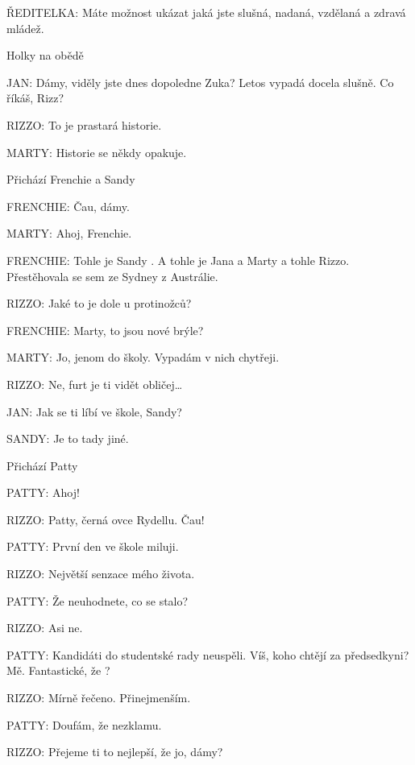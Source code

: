 \rep ŘEDITELKA:        Máte možnost ukázat jaká jste slušná, nadaná, vzdělaná a zdravá mládež.       

\scene Holky na obědě 

\rep JAN:        Dámy, viděly jste dnes dopoledne Zuka? Letos vypadá docela slušně.         Co říkáš, Rizz?

\rep RIZZO:        To je prastará historie.

\rep MARTY:        Historie se někdy opakuje.

\pop Přichází Frenchie a Sandy

\rep FRENCHIE:        Čau, dámy.

\rep MARTY:        Ahoj, Frenchie.

\rep FRENCHIE:        Tohle je Sandy . A tohle je Jana a Marty a tohle Rizzo. Přestěhovala se         sem ze Sydney z Austrálie.

\rep RIZZO:        Jaké to je dole u protinožců?

\rep FRENCHIE:        Marty, to jsou nové brýle?

\rep MARTY:        Jo, jenom do školy. Vypadám v nich chytřeji.

\rep RIZZO:        Ne, furt je ti vidět obličej…

\rep JAN:        Jak se ti líbí ve škole, Sandy?

\rep SANDY:        Je to tady jiné. 

\pop Přichází Patty

\rep PATTY:        Ahoj!

\rep RIZZO:         Patty, černá ovce Rydellu.  Čau! 

\rep PATTY:        První den ve škole miluji.

\rep RIZZO:        Největší senzace mého života.

\rep PATTY:        Že neuhodnete, co se stalo?

\rep RIZZO:        Asi ne.

\rep PATTY:        Kandidáti do studentské rady neuspěli. Víš, koho chtějí za                         předsedkyni? Mě. Fantastické, že ?

\rep RIZZO:        Mírně řečeno. Přinejmenším.

\rep PATTY:        Doufám, že nezklamu.

\rep RIZZO:        Přejeme ti to nejlepší, že jo, dámy?

